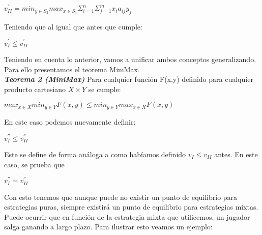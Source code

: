 \documentclass[10pt,a4paper]{book}
\begin{document}
\begin{center}

$ v^{'}_{II}=  min_{y \in S_2} max_{x \in S_1} \Sigma^n_{i=1} \Sigma^m_{j=1} x_i a_{ij} y_j$

\end{center}


Teniendo que al igual que antes que cumple:\\


\begin{center}

$v^{'}_I \leq v^{'}_{II}$

\end{center}


Teniendo en cuenta lo anterior, vamos a unificar ambos conceptos generalizando. Para ello presentamos el teorema MiniMax.\\

\textit{\textbf{Teorema 2 (MiniMax)}} Para cualquier función F(x,y) definido para cualquier producto cartesiano $X \times Y$ se cumple:\\

\begin{center}

$ max_{x \in X} min_{y \in Y} F(x,y) \leq min_{y \in Y} max_{x \in X} F(x,y)$

\end{center}

En este caso podemos nuevamente definir:\\

\begin{center}

$v^{''}_I \leq v^{''}_{II}$

\end{center}

Este se define de forma análoga a como habíamos definido $v_I \leq v_{II}$ antes. En este caso, se prueba que \\

\begin{center}

$v^{''}_I = v^{''}_{II}$

\end{center}

Con esto tenemos que aunque puede no existir un punto de  equilibrio para estrategias puras, siempre existirá un punto de equilibrio para estrategias mixtas.\\

Puede ocurrir que en función de la estrategia mixta que utilicemos, un jugador salga ganando a largo plazo. Para ilustrar esto veamos un ejemplo:\\
\end{document}
